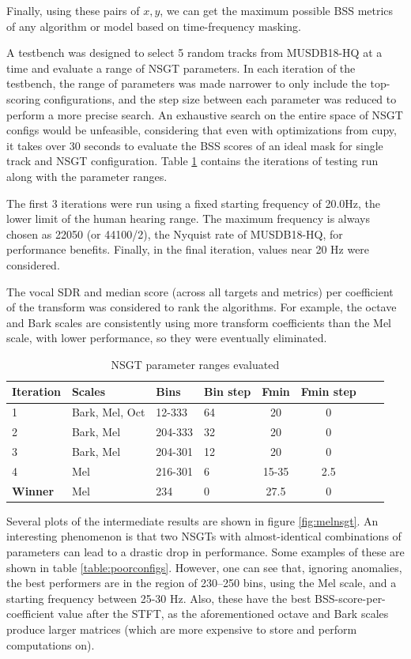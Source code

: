 \documentclass[letter,12pt,notitlepage]{article}
\begin{document}
Finally, using these pairs of $x, y$, we can get the maximum possible BSS metrics of any algorithm or model based on time-frequency masking.

A testbench was designed to select 5 random tracks from MUSDB18-HQ at a time and evaluate a range of NSGT parameters. In each iteration of the testbench, the range of parameters was made narrower to only include the top-scoring configurations, and the step size between each parameter was reduced to perform a more precise search. An exhaustive search on the entire space of NSGT configs would be unfeasible, considering that even with optimizations from cupy, it takes over 30 seconds to evaluate the BSS scores of an ideal mask for single track and NSGT configuration. Table \ref{table:nsgtparamsirm} contains the iterations of testing run along with the parameter ranges.

The  first 3 iterations were run using a fixed starting frequency of 20.0Hz, the lower limit of the human hearing range. The maximum frequency is always chosen as 22050 (or 44100/2), the Nyquist rate of MUSDB18-HQ, for performance benefits. Finally, in the final iteration, values near 20 Hz were considered.

The vocal SDR and median score (across all targets and metrics) per coefficient of the transform was considered to rank the algorithms. For example, the octave and Bark scales are consistently using more transform coefficients than the Mel scale, with lower performance, so they were eventually eliminated.

\begin{table}[ht]
	\centering
\begin{tabular}{ |l|l|l|l|c|c|c|c| }
	 \hline
	  Iteration & Scales & Bins & Bin step & Fmin & Fmin step \\
	 \hline
	 \hline
	 1 & Bark, Mel, Oct & 12-333 & 64 & 20 & 0 \\
	 \hline
	 2 & Bark, Mel & 204-333 & 32 & 20 & 0 \\
	 \hline
	 3 & Bark, Mel & 204-301 & 12 & 20 & 0 \\
	 \hline
	 4 & Mel & 216-301 & 6 & 15-35 & 2.5 \\
	 \hline
	 \textbf{Winner} & Mel & 234 & 0 & 27.5 & 0 \\
	 \hline
\end{tabular}
	\caption{NSGT parameter ranges evaluated}
	\label{table:nsgtparamsirm}
\end{table}

Several plots of the intermediate results are shown in figure \ref{fig:melnsgt}. An interesting phenomenon is that two NSGTs with almost-identical combinations of parameters can lead to a drastic drop in performance. Some examples of these are shown in table \ref{table:poorconfigs}. However, one can see that, ignoring anomalies, the best performers are in the region of 230--250 bins, using the Mel scale, and a starting frequency between 25-30 Hz. Also, these have the best BSS-score-per-coefficient value after the STFT, as the aforementioned octave and Bark scales produce larger matrices (which are more expensive to store and perform computations on).
\end{document}
